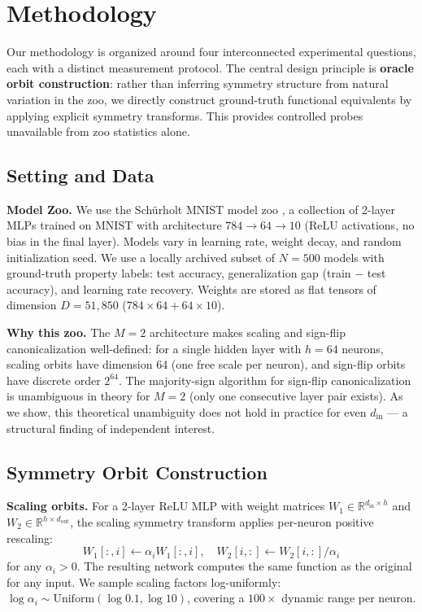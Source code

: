 \section{Methodology}
\label{sec:method}

Our methodology is organized around four interconnected experimental questions, each with a distinct measurement protocol. The central design principle is \textbf{oracle orbit construction}: rather than inferring symmetry structure from natural variation in the zoo, we directly construct ground-truth functional equivalents by applying explicit symmetry transforms. This provides controlled probes unavailable from zoo statistics alone.

\subsection{Setting and Data}

\textbf{Model Zoo.} We use the Schürholt MNIST model zoo \citep{Schurholt2022ModelZoos}, a collection of 2-layer MLPs trained on MNIST with architecture $784 \to 64 \to 10$ (ReLU activations, no bias in the final layer). Models vary in learning rate, weight decay, and random initialization seed. We use a locally archived subset of $N=500$ models with ground-truth property labels: test accuracy, generalization gap (train $-$ test accuracy), and learning rate recovery. Weights are stored as flat tensors of dimension $D=51{,}850$ ($784 \times 64 + 64 \times 10$).

\textbf{Why this zoo.} The $M=2$ architecture makes scaling and sign-flip canonicalization well-defined: for a single hidden layer with $h=64$ neurons, scaling orbits have dimension 64 (one free scale per neuron), and sign-flip orbits have discrete order $2^{64}$. The majority-sign algorithm for sign-flip canonicalization is unambiguous in theory for $M=2$ (only one consecutive layer pair exists). As we show, this theoretical unambiguity does not hold in practice for even $d_{\mathrm{in}}$ --- a structural finding of independent interest.

\subsection{Symmetry Orbit Construction}

\textbf{Scaling orbits.} For a 2-layer ReLU MLP with weight matrices $W_1 \in \mathbb{R}^{d_{\mathrm{in}} \times h}$ and $W_2 \in \mathbb{R}^{h \times d_{\mathrm{out}}}$, the scaling symmetry transform applies per-neuron positive rescaling:
\begin{equation}
W_1[:, i] \leftarrow \alpha_i W_1[:, i], \quad W_2[i, :] \leftarrow W_2[i, :] / \alpha_i
\end{equation}
for any $\alpha_i > 0$. The resulting network computes the same function as the original for any input. We sample scaling factors log-uniformly: $\log \alpha_i \sim \mathrm{Uniform}(\log 0.1, \log 10)$, covering a $100\times$ dynamic range per neuron.

